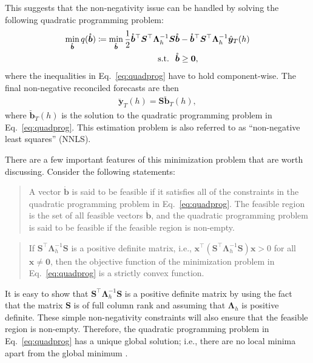 \documentclass[twocolumn]{svjour3}
\begin{document}
This suggests that the non-negativity issue can be handled by solving the following quadratic programming problem:
\begin{align}
\label{eq:quadprog}
\operatornamewithlimits{min}_{\mathring{\bm{b}}} q(\mathring{\bm{b}}) \coloneqq \operatornamewithlimits{min}_{\mathring{\bm{b}}} \frac{1}{2}\mathring{\bm{b}}^\top\bm{S}^\top\bm{\Lambda}^{-1}_{h}\bm{S}\mathring{\bm{b}} & - \mathring{\bm{b}}^\top\bm{S}^\top\bm{\Lambda}^{-1}_{h}\hat{\bm{y}}_{T}(h) \nonumber \\
\text{s.t.} \hspace*{2.5mm} \mathring{\bm{b}}                                                                                                                                                             & \geq \bm{0},
\end{align}
where the inequalities in Eq.~\eqref{eq:quadprog} have to hold component-wise. The final non-negative reconciled forecasts are then
\begin{align*}
\breve{\bm{y}}_{T}(h) = \bm{S}\breve{\bm{b}}_{T}(h),
\end{align*}
where $\breve{\bm{b}}_{T}(h)$ is the solution to the quadratic programming problem in Eq.~\eqref{eq:quadprog}. This estimation problem is also referred to as ``non-negative least squares'' (NNLS).

There are a few important features of this minimization problem that are worth discussing. Consider the following statements:

\begin{quote}
	A vector $\mathring{\bm{b}}$ is said to be feasible if it satisfies all of the constraints in the quadratic programming problem in Eq.~\eqref{eq:quadprog}. The feasible region is the set of all feasible vectors $\mathring{\bm{b}}$, and the quadratic programming problem is said to be feasible if the feasible region is non-empty.
\end{quote}

\begin{quote}
	If $\bm{S}^\top\bm{\Lambda}_{h}^{-1}\bm{S}$ is a positive definite matrix, i.e., $\bm{x}^\top(\bm{S}^\top\bm{\Lambda}_{h}^{-1}\bm{S})\bm{x} > 0$ for all $\bm{x} \neq \bm{0}$, then the objective function of the minimization problem in Eq.~\eqref{eq:quadprog} is a strictly convex function.
\end{quote}

It is easy to show that $\bm{S}^\top\bm{\Lambda}_{h}^{-1}\bm{S}$ is a positive definite matrix by using the fact that the matrix $\bm{S}$ is of full column rank and assuming that $\bm{\Lambda}_{h}$ is positive definite. These simple non-negativity constraints will also ensure that the feasible region is non-empty. Therefore, the quadratic programming problem in Eq.~\eqref{eq:quadprog} has a unique global solution; i.e., there are no local minima apart from the global minimum \citep{Turl2015}.
\end{document}
